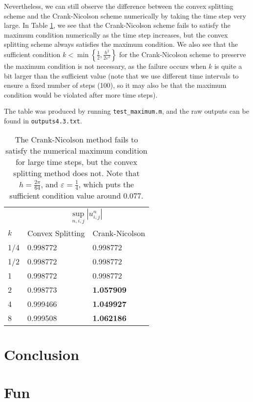 \documentclass{article}
\begin{document}
	Nevertheless, we can still observe the difference between the convex splitting scheme and the Crank-Nicolson scheme numerically by taking the time step very large. In Table \ref{table:max}, we see that the Crank-Nicolson scheme fails to satisfy the maximum condition numerically as the time step increases, but the convex splitting scheme always satisfies the maximum condition. We also see that the sufficient condition $k < \min\left\{\frac{1}{2}, \frac{h^2}{2\varepsilon^2}\right\}$ for the Crank-Nicolson scheme to preserve the maximum condition is not necessary, as the failure occurs when $k$ is quite a bit larger than the sufficient value (note that we use different time intervals to ensure a fixed number of steps (100), so it may also be that the maximum condition would be violated after more time steps).
	
	The table was produced by running \verb*|test_maximum.m|, and the raw outputs can be found in \verb*|outputs4.3.txt|.
	
	\begin{table}[h]
		\centering
		\begin{tabular}{@{}lll@{}}
			\toprule
			& \multicolumn{2}{c}{$\sup\limits_{n,i,j} |u^n_{i,j}|$}\\
			\cmidrule{2-3}
			$k$ & Convex Splitting & Crank-Nicolson \\
			\midrule
			1/4&	0.998772&	0.998772\\
			1/2	&0.998772&	0.998772 \\
			1	&0.998772&	0.998772\\
			2	&0.998773&	\bf1.057909\\
			4	&0.999466&	\bf1.049927\\
			8	&0.999508&	\bf1.062186\\
			\bottomrule
		\end{tabular}
		\caption{The Crank-Nicolson method fails to satisfy the numerical maximum condition for large time steps, but the convex splitting method does not. Note that $h=\frac{2\pi}{64}$, and $\varepsilon = \frac{1}{4}$, which puts the sufficient condition value around 0.077.}
		\label{table:max}
	\end{table}
	
	\section{Conclusion}
	
	\section{Fun}
	
	
	
	
\end{document}
